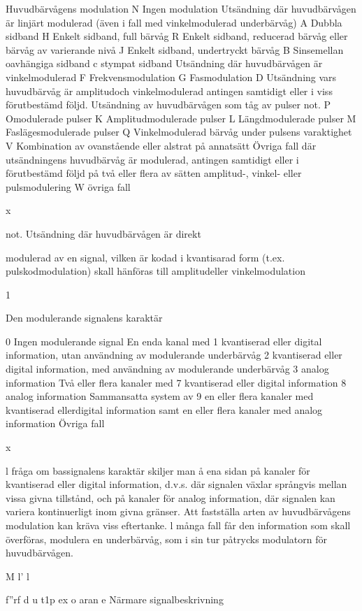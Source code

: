 \documentclass[a4paper,twoside,twocolumn,openright]{book}
\begin{document}
{{{{{{{{{{{{{Huvudbärvågens modulation
N Ingen modulation
Utsändning där huvudbärvågen är linjärt modulerad
(även i fall med vinkelmodulerad underbärvåg)
A Dubbla sidband
H Enkelt sidband, full bärvåg
R Enkelt sidband, reducerad bärvåg eller bärvåg av varierande nivå
J Enkelt sidband, undertryckt bärvåg
B Sinsemellan oavhängiga sidband
c stympat sidband
Utsändning där huvudbärvågen är vinkelmodulerad
F Frekvensmodulation
G Fasmodulation
D Utsändning vars huvudbärvåg är amplitudoch vinkelmodulerad antingen samtidigt eller
i viss förutbestämd följd.
Utsändning av huvudbärvågen som tåg av pulser not.
P Omodulerade pulser
K Amplitudmodulerade pulser
L Längdmodulerade pulser
M Faslägesmodulerade pulser
Q Vinkelmodulerad bärvåg under pulsens varaktighet
V Kombination av ovanstående eller alstrat på
annatsätt
Övriga fall där utsändningens huvudbärvåg är modulerad, antingen samtidigt eller i förutbestämd följd på
två eller flera av sätten amplitud-, vinkel- eller pulsmodulering
W
övriga fall

x

not. Utsändning där huvudbärvågen är direkt

modulerad av en signal, vilken är kodad
i kvantisarad form (t.ex. pulskodmodulation) skall hänföras till amplitudeller vinkelmodulation

1

Den modulerande signalens karaktär

0 Ingen modulerande signal
En enda kanal med
1 kvantiserad eller digital information, utan användning av modulerande underbärvåg
2 kvantiserad eller digital information, med användning av modulerande underbärvåg
3 analog information
Två eller flera kanaler med
7 kvantiserad eller digital information
8 analog information
Sammansatta system av
9 en eller flera kanaler med kvantiserad ellerdigital information samt
en eller flera kanaler med analog
information
Övriga fall

x

l fråga om bassignalens karaktär skiljer
man å ena sidan på kanaler för kvantiserad eller digital information, d.v.s. där signalen växlar språngvis mellan vissa givna tillstånd, och på kanaler för analog information, där signalen kan variera kontinuerligt inom givna gränser.
Att fastställa arten av huvudbärvågens modulation kan kräva viss eftertanke. l många fall
får den information som skall överföras, modulera en underbärvåg, som i sin tur påtrycks
modulatorn för huvudbärvågen.

M l' l

f''rf
d
u t1p ex o aran e
Närmare signalbeskrivning

}}}}}}}}}}}}}
\end{document}
